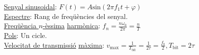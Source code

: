 \documentclass[12pt]{article}
\begin{document}
\begin{multicols}{5}
\underline{Senyal sinusoidal}: $F(t) = A\text{sin}(2\pi f_1t+ \varphi)$ \\
\underline{Espectre}: Rang de freqüències del senyal. \\
\underline{Freqüència $n$-èssima} \underline{harmònica}: $f_n = \frac{n\omega_0}{2\pi} = \frac{n}{T}$ \\
\underline{Pols}: Un cicle. \\
\underline{Velocitat de transmissió} \underline{màxima}: $v_\text{max} = \frac{1}{T_\text{bit}} = \frac{1}{2\tau} = \frac{f_b}{2}, T_{\text{bit}} = 2 \tau$ \\

\end{multicols}
\end{document}

